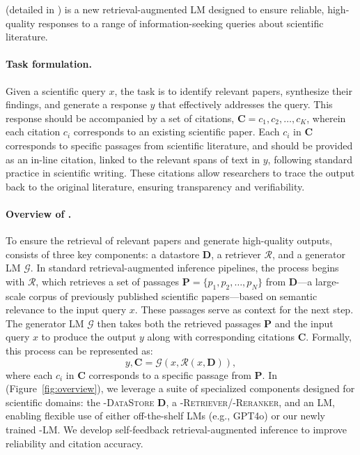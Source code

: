 \label{sec:model}

\model (detailed in ) is a new retrieval-augmented LM designed to ensure reliable, high-quality responses to a range of information-seeking queries about scientific literature. 

\paragraph{Task formulation. }
Given a scientific query $x$, the task is to identify relevant papers, synthesize their findings, and generate a response $y$ that effectively addresses the query. This response should be accompanied by a set of citations, $\mathbf{C} = {c_1, c_2, \ldots, c_K}$, wherein each citation $c_i$ corresponds to an existing scientific paper. Each $c_i$ in $\mathbf{C}$ corresponds to specific passages from scientific literature, and should be provided as an in-line citation, linked to the relevant spans of text in $y$, following standard practice in scientific writing.
These citations allow researchers to trace the output back to the original literature, ensuring transparency and verifiability. 

\paragraph{Overview of \model.}
To ensure the retrieval of relevant papers and generate high-quality outputs, \data consists of three key components: a datastore $\mathbf{D}$, a retriever $\mathcal{R}$, and a generator LM $\mathcal{G}$. 
In standard retrieval-augmented inference pipelines, the process begins with $\mathcal{R}$, which retrieves a set of passages $\mathbf{P} = \{p_1, p_2, \ldots, p_N\}$ from $\mathbf{D}$---a large-scale corpus of previously published scientific papers—based on semantic relevance to the input query $x$. These passages serve as context for the next step. 
The generator LM $\mathcal{G}$ then takes both the retrieved passages $\mathbf{P}$ and the input query $x$ to produce the  output $y$ along with corresponding citations $\mathbf{C}$. Formally, this process can be represented as: 
\begin{equation*}
    y, \mathbf{C} = \mathcal{G}(x, \mathcal{R}(x, \mathbf{D})), 
\end{equation*}
where each $c_i$ in $\mathbf{C}$ corresponds to a specific passage from $\mathbf{P}$. 
In \model (Figure~\ref{fig:overview}), we leverage a suite of specialized components designed for scientific domains: the \model-\textsc{DataStore} $\mathbf{D}$, a \model-\textsc{Retriever}/-\textsc{Reranker}, and an LM, enabling flexible use of either off-the-shelf LMs (e.g., GPT4o) or our newly trained \model-LM. We develop self-feedback retrieval-augmented inference to improve reliability and citation accuracy. 


